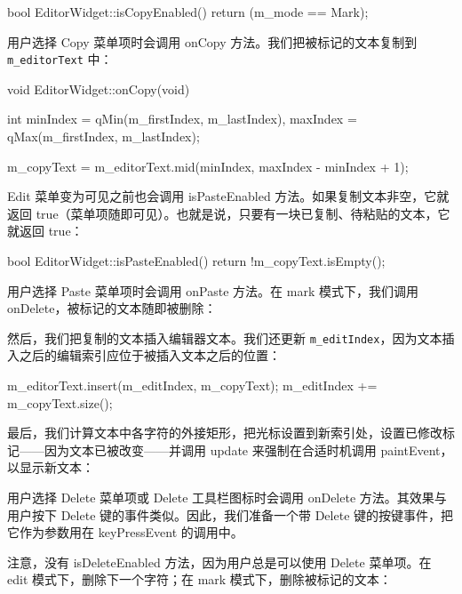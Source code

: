 \begin{codebox}
bool EditorWidget::isCopyEnabled() {
  return (m_mode == Mark);
}
\end{codebox}

用户选择 Copy 菜单项时会调用 onCopy 方法。我们把被标记的文本复制到 \texttt{m\_editorText} 中：

\begin{codebox}
void EditorWidget::onCopy(void) {
  int minIndex = qMin(m_firstIndex, m_lastIndex),
  maxIndex = qMax(m_firstIndex, m_lastIndex);

  m_copyText =
    m_editorText.mid(minIndex, maxIndex - minIndex + 1);
}
\end{codebox}

Edit 菜单变为可见之前也会调用 isPasteEnabled 方法。如果复制文本非空，它就返回 true（菜单项随即可见）。也就是说，只要有一块已复制、待粘贴的文本，它就返回 true：

\begin{codebox}
bool EditorWidget::isPasteEnabled() {
  return !m_copyText.isEmpty();
}
\end{codebox}

用户选择 Paste 菜单项时会调用 onPaste 方法。在 mark 模式下，我们调用 onDelete，被标记的文本随即被删除：

\begin{codebox}
void EditorWidget::onPaste(void) {
  if (m_mode == Mark) {
     onDelete();
  }
\end{codebox}

然后，我们把复制的文本插入编辑器文本。我们还更新 \texttt{m\_editIndex}，因为文本插入之后的编辑索引应位于被插入文本之后的位置：

\begin{codebox}
  m_editorText.insert(m_editIndex, m_copyText);
  m_editIndex += m_copyText.size();
\end{codebox}

最后，我们计算文本中各字符的外接矩形，把光标设置到新索引处，设置已修改标记——因为文本已被改变——并调用 update 来强制在合适时机调用 paintEvent，以显示新文本：

\begin{codebox}
  calculate();
  setCaret();
  setModifiedFlag(true);
  update();
}
\end{codebox}

用户选择 Delete 菜单项或 Delete 工具栏图标时会调用 onDelete 方法。其效果与用户按下 Delete 键的事件类似。因此，我们准备一个带 Delete 键的按键事件，把它作为参数用在 keyPressEvent 的调用中。

注意，没有 isDeleteEnabled 方法，因为用户总是可以使用 Delete 菜单项。在 edit 模式下，删除下一个字符；在 mark 模式下，删除被标记的文本：

